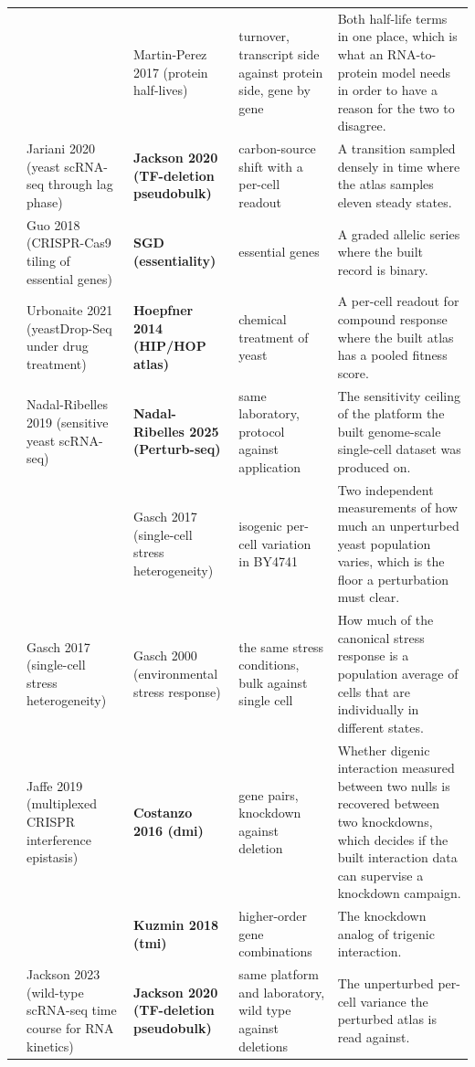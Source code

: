 \begin{landscape}
\begin{longtable}{@{}r@{\hspace{4pt}} L{42mm} L{44mm} L{48mm} L{96mm}@{}}
 &  & Martin-Perez 2017 (protein half-lives) & turnover, transcript side against protein side, gene by gene & Both half-life terms in one place, which is what an RNA-to-protein model needs in order to have a reason for the two to disagree. \\
 & Jariani 2020 (yeast scRNA-seq through lag phase) & \textbf{Jackson 2020 (TF-deletion pseudobulk)} & carbon-source shift with a per-cell readout & A transition sampled densely in time where the atlas samples eleven steady states. \\
 & Guo 2018 (CRISPR-Cas9 tiling of essential genes) & \textbf{SGD (essentiality)} & essential genes & A graded allelic series where the built record is binary. \\
 & Urbonaite 2021 (yeastDrop-Seq under drug treatment) & \textbf{Hoepfner 2014 (HIP/HOP atlas)} & chemical treatment of yeast & A per-cell readout for compound response where the built atlas has a pooled fitness score. \\
 & Nadal-Ribelles 2019 (sensitive yeast scRNA-seq) & \textbf{Nadal-Ribelles 2025 (Perturb-seq)} & same laboratory, protocol against application & The sensitivity ceiling of the platform the built genome-scale single-cell dataset was produced on. \\
 &  & Gasch 2017 (single-cell stress heterogeneity) & isogenic per-cell variation in BY4741 & Two independent measurements of how much an unperturbed yeast population varies, which is the floor a perturbation must clear. \\
 & Gasch 2017 (single-cell stress heterogeneity) & Gasch 2000 (environmental stress response) & the same stress conditions, bulk against single cell & How much of the canonical stress response is a population average of cells that are individually in different states. \\
 & Jaffe 2019 (multiplexed CRISPR interference epistasis) & \textbf{Costanzo 2016 (dmi)} & gene pairs, knockdown against deletion & Whether digenic interaction measured between two nulls is recovered between two knockdowns, which decides if the built interaction data can supervise a knockdown campaign. \\
 &  & \textbf{Kuzmin 2018 (tmi)} & higher-order gene combinations & The knockdown analog of trigenic interaction. \\
 & Jackson 2023 (wild-type scRNA-seq time course for RNA kinetics) & \textbf{Jackson 2020 (TF-deletion pseudobulk)} & same platform and laboratory, wild type against deletions & The unperturbed per-cell variance the perturbed atlas is read against. \\

\end{longtable}
\end{landscape}
